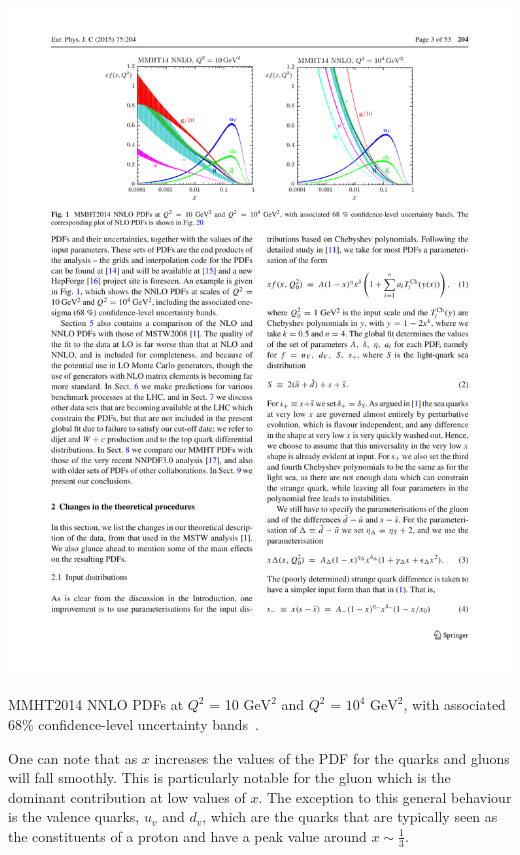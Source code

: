 \begin{table}[!hbt]
  \begin{center}
    \includegraphics[width=1\linewidth, angle=0]{figs/Theory/qcd_pdf.pdf}
  \end{center}
  \caption[MMHT2014 NNLO PDFs at $Q^2$ = 10 $\text{GeV}^2$ and $Q^2$ = $10^4$ $\text{GeV}^2$, with associated 68\% confidence-level uncertainty bands.]
  {MMHT2014 NNLO PDFs at $Q^2$ = 10 $\text{GeV}^2$ and $Q^2$ = $10^4$ $\text{GeV}^2$, with associated 68\% confidence-level uncertainty bands~\cite{theo-qcd_pdf}.}
  \label{fig:theo-qcd_pdf}
\end{table}


One can note that as $x$ increases the values of the PDF for the quarks and gluons will fall smoothly.
This is particularly notable for the gluon which is the dominant contribution at low values of $x$.
The exception to this general behaviour is the valence quarks,
$u_v$ and $d_v$,
which are the quarks that are typically seen as the constituents of a proton and have a peak value around $x \sim \frac{1}{3}$.

